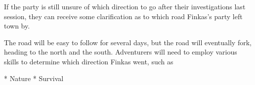 If the party is still unsure of which direction to go after their investigations last session, they can receive some clarification as to which road Finkas's party left town by.

The road will be easy to follow for several days, but the road will eventually fork, heading to the north and the south.
Adventurers will need to employ various skills to determine which direction Finkas went, such as

* Nature
* Survival
